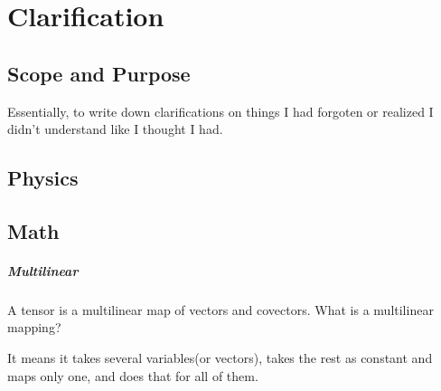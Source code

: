 \chapter{Clarification}
\section{Scope and Purpose}

Essentially, to write down clarifications on things I had forgoten or realized I didn't understand like I thought I had.
\section{Physics}


\section{Math}

\paragraph{Multilinear}

A tensor is a multilinear map of vectors and covectors. What is a multilinear mapping?

It means it takes several variables(or vectors), takes the rest as constant and maps only one, and does that for all of them.
